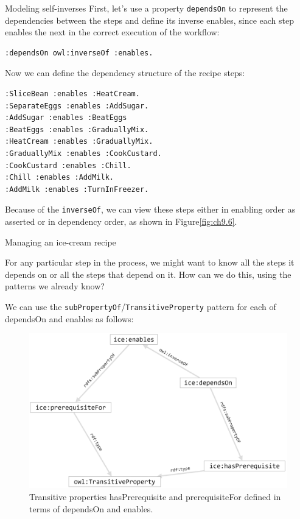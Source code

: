 \begin{challenge}{Modeling self-inverses}
First, let's use a property \texttt{dependsOn} to represent the dependencies
between the steps and define its inverse enables, since each step
enables the next in the correct execution of the workflow:

\begin{lstlisting}
:dependsOn owl:inverseOf :enables.
\end{lstlisting}

Now we can define the dependency structure of the recipe steps:

\begin{lstlisting}
:SliceBean :enables :HeatCream.
:SeparateEggs :enables :AddSugar.
:AddSugar :enables :BeatEggs
:BeatEggs :enables :GraduallyMix.
:HeatCream :enables :GraduallyMix.
:GraduallyMix :enables :CookCustard.
:CookCustard :enables :Chill.
:Chill :enables :AddMilk.
:AddMilk :enables :TurnInFreezer.
\end{lstlisting}

Because of the \texttt{inverseOf}, we can view these steps either in enabling
order as asserted or in dependency order, as shown in Figure\ref{fig:ch9.6}.

\begin{challenge}{Managing an ice-cream recipe}

For any particular step in the process, we might want to know all the
steps it depends on or all the steps that depend on it. How can we do
this, using the patterns we already know?

\solution

We can use the \texttt{subPropertyOf}/\texttt{TransitiveProperty} pattern for each of
dependsOn and
enables as follows:

\begin{figure}
\centering
\includegraphics[width=5in]{SWWOv3/media/ch9/figure9-7.png}
\caption{Transitive properties hasPrerequisite and prerequisiteFor defined in
terms of dependsOn and enables.
}
\label{fig:ch9.7}
\end{figure}




\end{challenge}
\end{challenge}
